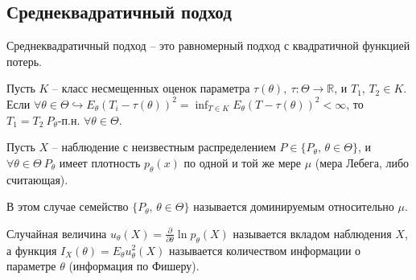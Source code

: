 \subsection{Среднеквадратичный подход}
\begin{definition}
Среднеквадратичный подход -- это равномерный подход с квадратичной функцией потерь.
\end{definition}
\begin{exercise}
Пусть $\displaystyle K$ -- класс несмещенных оценок параметра $\displaystyle \tau ( \theta ),\ \tau :\Theta \rightarrow \mathbb{R}$, и $\displaystyle T_{1},\, T_{2} \in K$. Если $\displaystyle \forall \theta \in \Theta \hookrightarrow E_{\theta }( T_{i} -\tau ( \theta ))^{2} =\inf_{T\in K} E_{\theta }( T-\tau ( \theta ))^{2} < \infty $, то $\displaystyle T_{1} =T_{2} \ P_{\theta }$-п.н. $\displaystyle \forall \theta \in \Theta $.
\end{exercise}
Пусть $\displaystyle X$ -- наблюдение с неизвестным распределением $\displaystyle P\in \{P_{\theta },\, \theta \in \Theta \}$, и $\displaystyle \forall \theta \in \Theta\ P_{\theta }$ имеет плотность $\displaystyle p_{\theta }( x)$ по одной и той же мере $\displaystyle \mu $ (мера Лебега, либо считающая).
\begin{definition}
В этом случае семейство $\displaystyle \{P_{\theta },\, \theta \in \Theta \}$ называется доминируемым относительно $\displaystyle \mu $.
\end{definition}
\begin{definition}
Случайная величина $\displaystyle u_{\theta }( X) =\frac{\partial }{\partial \theta }\ln p_{\theta }( X)$ называется вкладом наблюдения $\displaystyle X$, а функция $\displaystyle I_{X}( \theta ) =E_{\theta } u_{\theta }^{2}( X)$ называется количеством информации о параметре $\displaystyle \theta $ (информация по Фишеру).
\end{definition}
